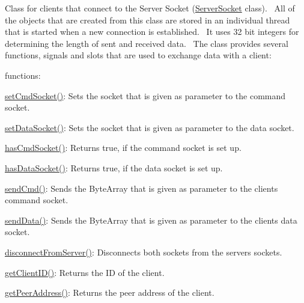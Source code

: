 Class for clients that connect to the Server Socket (\hyperlink{class_network_1_1_server_socket}{Server\+Socket} class).~\newline
 All of the objects that are created from this class are stored in an individual thread that is started when a new connection is established.~\newline
 It uses 32 bit integers for determining the length of sent and received data.~\newline
 The class provides several functions, signals and slots that are used to exchange data with a client\+: 
\begin{DoxyItemize}
\item functions\+: 
\begin{DoxyItemize}
\item \hyperlink{class_network_1_1_connected_client_a84d4ba47b0b82bb01fa6faca9e793412}{set\+Cmd\+Socket()}\+: Sets the socket that is given as parameter to the command socket. 
\item \hyperlink{class_network_1_1_connected_client_ab992b4c8be1eca019690e728f34d8bbd}{set\+Data\+Socket()}\+: Sets the socket that is given as parameter to the data socket. 
\item \hyperlink{class_network_1_1_connected_client_ac406ccefcf1864e3a50da9c1b05ef9bc}{has\+Cmd\+Socket()}\+: Returns true, if the command socket is set up. 
\item \hyperlink{class_network_1_1_connected_client_a7e702f3d7a9da70838b0baae35a3558e}{has\+Data\+Socket()}\+: Returns true, if the data socket is set up. 
\item \hyperlink{class_network_1_1_connected_client_a4d4d24c1fb549997efdc0e6d3f336206}{send\+Cmd()}\+: Sends the Byte\+Array that is given as parameter to the clients command socket. 
\item \hyperlink{class_network_1_1_connected_client_a8ed4284d7f5187ebcf16a1dd8db07622}{send\+Data()}\+: Sends the Byte\+Array that is given as parameter to the clients data socket. 
\item \hyperlink{class_network_1_1_connected_client_a64c600f1673753092cd6eaa24a67081a}{disconnect\+From\+Server()}\+: Disconnects both sockets from the servers sockets. 
\item \hyperlink{class_network_1_1_connected_client_a97812f8788cc3635edceeb0b6202f19b}{get\+Client\+I\+D()}\+: Returns the I\+D of the client.
\item 
\item \hyperlink{class_network_1_1_connected_client_a7e0ba50bdccd46a6c3a2a4a2f07e95f1}{get\+Peer\+Address()}\+: Returns the peer address of the client. 

\end{DoxyItemize}
\end{DoxyItemize}

